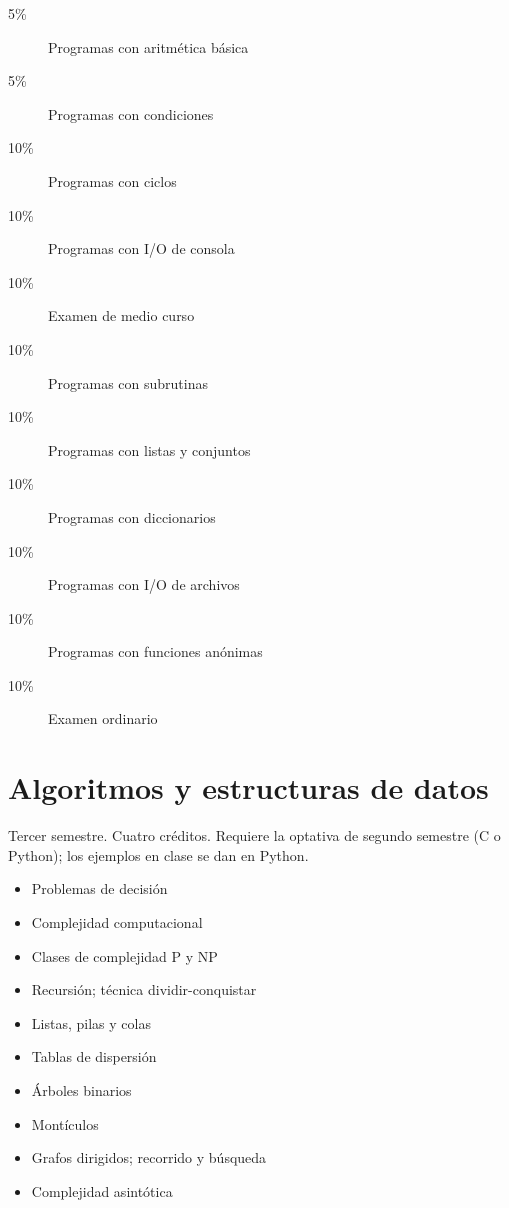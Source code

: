 \documentclass{article}
\begin{document}
\begin{multicols}{4}
\begin{description}
\item[5\%]{Programas con aritm\'{e}tica b\'{a}sica}
\item[5\%]{Programas con condiciones} 
\item[10\%]{Programas con ciclos}
\item[10\%]{Programas con I/O de consola}
\item[10\%]{Examen de medio curso}
\item[10\%]{Programas con subrutinas}
\item[10\%]{Programas con listas y conjuntos}
\item[10\%]{Programas con diccionarios}
\item[10\%]{Programas con I/O de archivos}              
\item[10\%]{Programas con funciones an\'{o}nimas}
\item[10\%]{Examen ordinario}
\end{description}

\vfill\null \columnbreak

\hypertarget{ayedd}{\section*{Algoritmos y estructuras de datos}} 

Tercer semestre. Cuatro cr\'{e}ditos. Requiere la optativa de segundo
semestre (C o Python); los ejemplos en clase se dan en Python.

\begin{itemize}
\item{Problemas de decisi\'{o}n}
\item{Complejidad computacional}
\item{Clases de complejidad P y NP}    
\item{Recursi\'{o}n; t\'{e}cnica dividir-conquistar}
\item{Listas, pilas y colas}
\item{Tablas de dispersi\'{o}n}
\item{\'{A}rboles binarios}
\item{Mont\'{i}culos}
\item{Grafos dirigidos; recorrido y b\'{u}squeda}
\item{Complejidad asint\'{o}tica}
\end{itemize}


\end{multicols}
\end{document}
